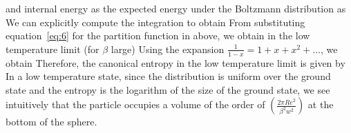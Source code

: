 \documentclass[letterpaper,english,10pt]{article}
\begin{document}
\begin{shaded*}
\begin{exmp}
{}
and internal energy as the expected energy under the Boltzmann distribution as 
We can explicitly compute the integration to obtain
From substituting equation~\eqref{eq:6} for the partition function in above, we obtain in the low temperature limit (for  $\beta$ large)
Using the expansion $\frac{1}{1-x} = 1 + x + x^2 + ...$, we obtain
Therefore, the canonical entropy in the low temperature limit is given by
In a low temperature state, since the distribution is uniform over the ground state and the entropy is the logarithm of the size of the ground state, we see intuitively that the particle occupies a volume of the order of $\left( \frac{2 \pi Re^2}{\beta^2 w^2} \right)$ at the bottom of the sphere.
\end{exmp}
\end{shaded*}
\end{document}
